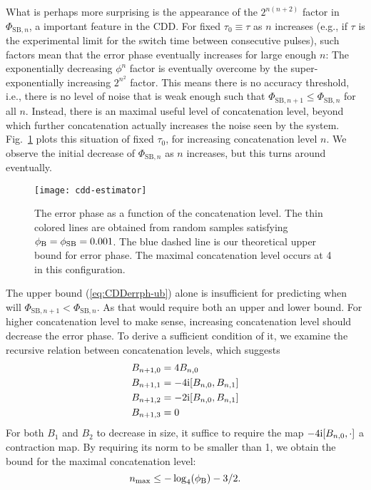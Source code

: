 \documentclass[b5paper,11pt]{article}
\begin{document}
What is perhaps more surprising is the appearance of the $2^{n(n+2)}$ factor in $\Phi_{\mathrm{SB},n}$, a important feature in the CDD. For fixed $\tau_0\equiv \tau$ as $n$ increases (e.g., if $\tau$ is the experimental limit for the switch time between consecutive pulses), such factors mean that the error phase eventually increases for large enough $n$: The exponentially decreasing $\phi^n$ factor is eventually overcome by the super-exponentially increasing $2^{n^2}$ factor. This means there is no accuracy threshold, i.e., there is no level of noise that is weak enough such that $\Phi_{\mathrm{SB},n+1}\leq\Phi_{\mathrm{SB},n}$ for all $n$. Instead, there is an maximal useful level of concatenation level, beyond which further concatenation actually increases the noise seen by the system. Fig.~\ref{fig:estimator-size} plots this situation of fixed $\tau_0$, for increasing concatenation level $n$. We observe the initial decrease of $\Phi_{\mathrm{SB},n}$ as $n$ increases, but this turns around eventually. 

\begin{figure}
    \texttt{[image: cdd-estimator]}
    \caption{The error phase as a function of the concatenation level. 
    The thin colored lines are obtained from random samples satisfying $\phi_{\mathrm{B}}=\phi_{\mathrm{SB}}=0.001$. The blue dashed line is our theoretical upper bound for error phase. The maximal concatenation level occurs at 4 in this configuration.}
    \label{fig:estimator-size}
\end{figure}

The upper bound (\ref{eq:CDDerrph-ub}) alone is insufficient 
for predicting when will $\Phi_{\mathrm{SB},n+1} < \Phi_{\mathrm{SB},n} $. As that would require both an upper and lower bound. 
For higher concatenation level to make sense, increasing concatenation level should decrease the error phase. To derive a sufficient condition of it, we examine the recursive relation between concatenation 
levels, which suggests 
\begin{equation}
\begin{aligned}
 B_{n+1,0} &= 4  B_{n,0}\\
 B_{n+1,1} & = -4\mathrm{i} [B_{n,0}, B_{n,1} ]\\
 B_{n+1,2} & = -2\mathrm{i} [B_{n,0}, B_{n,1} ]\\
  B_{n+1,3} &=0
\end{aligned}
\end{equation}
For both $B_1$ and $B_2$ to decrease in size, it suffice to require the map 
$-4\mathrm{i} [B_{n,0},\cdot]$ a contraction map. 
By requiring its norm to be smaller than 1, we obtain the bound for the maximal concatenation level:
\begin{equation}\label{eq:cdd-max-level}
n_{\max}\le -\log_4(\phi_{\mathrm{B}})-3/2.
\end{equation}
\end{document}
